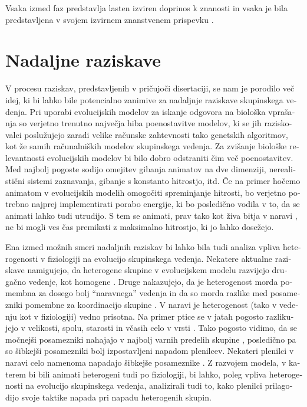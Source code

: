 \begin{slovenian}
Vsaka izmed faz predstavlja lasten izviren doprinos k znanosti in vsaka je bila predstavljena v svojem izvirnem znanstvenem prispevku \cite{demsar2014simulated,demsar2015simulating,demsar2017evolution,demsar2016balanced}.

\section{Nadaljne raziskave}

V procesu raziskav, predstavljenih v pričujoči disertaciji, se nam je porodilo več idej, ki bi lahko bile potencialno zanimive za nadaljnje raziskave skupinskega vedenja. Pri uporabi evolucijskih modelov za iskanje odgovora na biološka vprašanja so verjetno trenutno največja hiba poenostavitve modelov, ki se jih raziskovalci poslužujejo zaradi velike računske zahtevnosti tako genetskih algoritmov, kot že samih računalniških modelov skupinskega vedenja. Za zvišanje biološke relevantnosti evolucijskih modelov bi bilo dobro odstraniti čim več poenostavitev. Med najbolj pogoste sodijo omejitev gibanja animatov na dve dimenziji, nerealistični sistemi zaznavanja, gibanje s konstanto hitrostjo, itd. Če na primer hočemo animatom v evolucijskih modelih omogočiti spreminjanje hitrosti, bo verjetno potrebno najprej implementirati porabo energije, ki bo posledično vodila v to, da se animati lahko tudi utrudijo. S tem se animati, prav tako kot živa bitja v naravi \cite{norin2016measurement,roche2013finding}, ne bi mogli ves čas premikati z maksimalno hitrostjo, ki jo lahko dosežejo. 

Ena izmed možnih smeri nadaljnih raziskav bi lahko bila tudi analiza vpliva heterogenosti v fiziologiji na evolucijo skupinskega vedenja. Nekatere aktualne raziskave namigujejo, da heterogene skupine v evolucijskem modelu razvijejo drugačno vedenje, kot homogene \cite{olson2015exploring}. Druge nakazujejo, da je heterogenost morda pomembna za dosego bolj ``naravnega'' vedenja \cite{demsar2013family} in da so morda razlike med posamezniki pomembne za koordinacijo skupine \cite{marras2012information,marras2013schooling}. V naravi je heterogenost (tako v vedenju kot v fiziologiji) vedno prisotna. Na primer ptice se v jatah pogosto razlikujejo v velikosti, spolu, starosti in včasih celo v vrsti \cite{lebarbajec2009organized,jolles2013heterogeneous}. Tako pogosto vidimo, da se močnejši posamezniki nahajajo v najbolj varnih predelih skupine \cite{hamilton1971geometry}, posledično pa so šibkejši posamezniki bolj izpostavljeni napadom plenilcev. Nekateri plenilci v naravi celo namenoma napadajo šibkejše posameznike \cite{domenici2014howsailfish,marras2015notsofast}. Z razvojem modela, v katerem bi bili animati heterogeni tudi po fiziologiji, bi lahko, poleg vpliva heterogenosti na evolucijo skupinskega vedenja, analizirali tudi to, kako plenilci prilagodijo svoje taktike napada pri napadu heterogenih skupin.


\end{slovenian}
